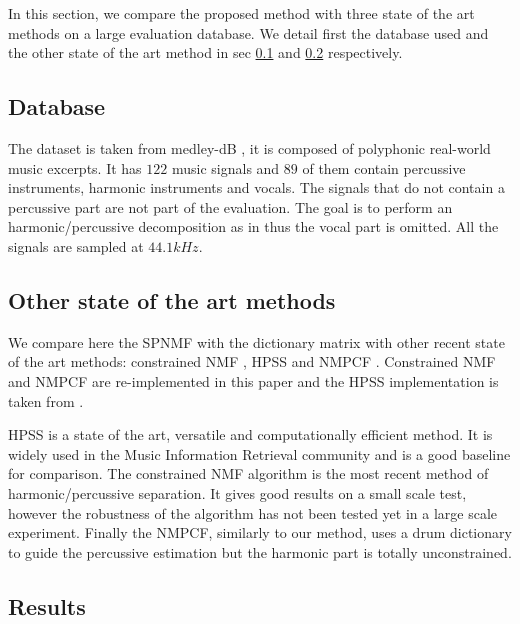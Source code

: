 \documentclass[journal]{IEEEtran}
\begin{document}
In this section, we compare the proposed method with three state of the art methods on a large evaluation database. We detail first the database used and the other state of the art method in sec \ref{database} and \ref{soth} respectively.  


\subsection{Database}\label{database}

The dataset is taken from medley-dB \cite{bittner2014medleydb}, it is composed of polyphonic real-world music excerpts. It has $122$ music signals and $89$ of them contain percussive instruments, harmonic instruments and vocals. The signals that do not contain a percussive part are not part of the evaluation. The goal is to perform an harmonic/percussive decomposition as in \cite{canadas2014percussive} thus the vocal part is omitted. All the signals are sampled at $44.1kHz$.

\subsection{Other state of the art methods}\label{soth}

We compare here the SPNMF with the dictionary matrix with other recent state of the art methods: constrained NMF \cite{canadas2014percussive}, HPSS \cite{fitzgerald2010harmonic} and NMPCF \cite{kim2011nonnegative}. Constrained NMF and NMPCF are re-implemented in this paper and the HPSS implementation is taken from \cite{DriedgerMueller14_TSMToolbox_DAFX}.

HPSS is a state of the art, versatile and computationally efficient method. It is widely used in the Music Information Retrieval community and is a good baseline for comparison. The constrained NMF algorithm is the most recent method of harmonic/percussive separation. It gives good results on a small scale test, however the robustness of the algorithm has not been tested yet in a large scale experiment. Finally the NMPCF, similarly to our method, uses a drum dictionary to guide the percussive estimation but the harmonic part is totally unconstrained. 


\subsection{Results} \label{subResults}
\end{document}
